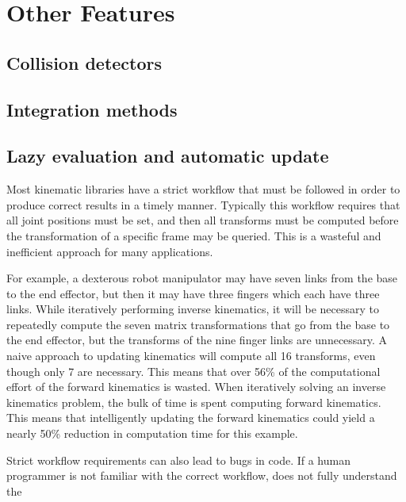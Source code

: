\section{Other Features}
\subsection{Collision detectors}
\subsection{Integration methods}
\subsection{Lazy evaluation and automatic update}
\label{sec:lazy}
Most kinematic libraries have a strict workflow that must be followed in order to produce correct results in a timely manner. Typically this workflow requires that all joint positions must be set, and then all transforms must be computed before the transformation of a specific frame may be queried. This is a wasteful and inefficient approach for many applications.

For example, a dexterous robot manipulator may have seven links from the base to the end effector, but then it may have three fingers which each have three links. While iteratively performing inverse kinematics, it will be necessary to repeatedly compute the seven matrix transformations that go from the base to the end effector, but the transforms of the nine finger links are unnecessary. A naive approach to updating kinematics will compute all 16 transforms, even though only 7 are necessary. This means that over 56\% of the computational effort of the forward kinematics is wasted. When iteratively solving an inverse kinematics problem, the bulk of time is spent computing forward kinematics. This means that intelligently updating the forward kinematics could yield a nearly 50\% reduction in computation time for this example.

Strict workflow requirements can also lead to bugs in code. If a human programmer is not familiar with the correct workflow, does not fully understand the 

